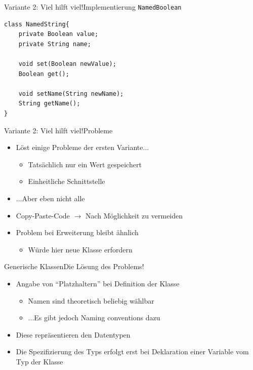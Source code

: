\begin{frame}[fragile]{Variante 2: Viel hilft viel!}{Implementierung \texttt{NamedBoolean}}
\lstset{style=java}
\begin{lstlisting}
class NamedString{
    private Boolean value;
    private String name;
    
    void set(Boolean newValue);
    Boolean get();
    
    void setName(String newName);
    String getName();
}
\end{lstlisting}
\end{frame}

\begin{frame}{Variante 2: Viel hilft viel!}{Probleme}
\begin{itemize}
    \item Löst einige Probleme der ersten Variante...
    \begin{itemize}
        \item Tatsächlich nur ein Wert gespeichert
        \item Einheitliche Schnittstelle
    \end{itemize}
    \item ...Aber eben nicht alle
    \item Copy-Paste-Code $\rightarrow$ Nach Möglichkeit zu vermeiden
    \item Problem bei Erweiterung bleibt ähnlich
    \begin{itemize}
        \item Würde hier neue Klasse erfordern
    \end{itemize}
\end{itemize}
\end{frame}



\begin{frame}{Generische Klassen}{Die Lösung des Problems!}
    \begin{itemize}
        \item Angabe von "`Platzhaltern"' bei Definition der Klasse
        \begin{itemize}
            \item Namen sind theoretisch beliebig wählbar
            \item ...Es gibt jedoch Naming conventions dazu
        \end{itemize}
        \item Diese repräsentieren den Datentypen
        \item Die Spezifizierung des Typs erfolgt erst bei Deklaration einer Variable vom Typ der Klasse
    \end{itemize}
\end{frame}

